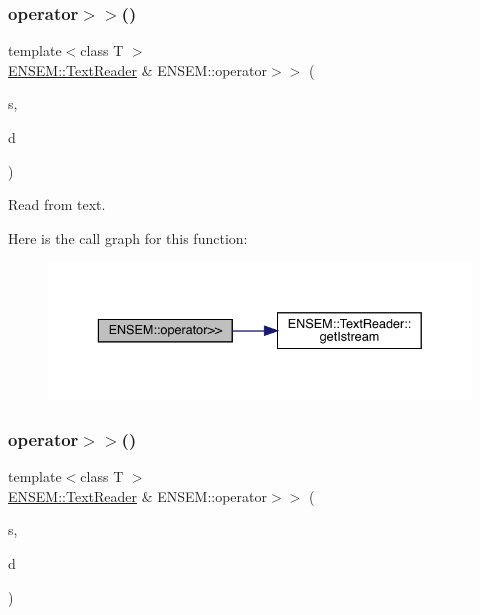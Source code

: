 \subsubsection{\texorpdfstring{operator$>$$>$()}{operator>>()}\hspace{0.1cm}{\footnotesize\ttfamily [4/7]}}
{\footnotesize\ttfamily template$<$class T $>$ \\
\mbox{\hyperlink{classENSEM_1_1TextReader}{E\+N\+S\+E\+M\+::\+Text\+Reader}} \& E\+N\+S\+E\+M\+::operator$>$$>$ (\begin{DoxyParamCaption}\item[{\mbox{\hyperlink{classENSEM_1_1TextReader}{E\+N\+S\+E\+M\+::\+Text\+Reader}} \&}]{s,  }\item[{\mbox{\hyperlink{classENSEM_1_1EScalar}{E\+Scalar}}$<$ \mbox{\hyperlink{classENSEM_1_1OTensor}{O\+Tensor}}$<$ T $>$ $>$ \&}]{d }\end{DoxyParamCaption})\hspace{0.3cm}{\ttfamily [inline]}}



Read from text. 

Here is the call graph for this function\+:\nopagebreak
\begin{figure}[H]
\begin{center}
\leavevmode
\includegraphics[width=336pt]{d2/d94/namespaceENSEM_a09c1f3286f4513b7ecefb96943278df6_cgraph}
\end{center}
\end{figure}
\mbox{\label{namespaceENSEM_a5d4f982512e5f2e704e9f359ce2bf383}} 
\subsubsection{\texorpdfstring{operator$>$$>$()}{operator>>()}\hspace{0.1cm}{\footnotesize\ttfamily [5/7]}}
{\footnotesize\ttfamily template$<$class T $>$ \\
\mbox{\hyperlink{classENSEM_1_1TextReader}{E\+N\+S\+E\+M\+::\+Text\+Reader}} \& E\+N\+S\+E\+M\+::operator$>$$>$ (\begin{DoxyParamCaption}\item[{\mbox{\hyperlink{classENSEM_1_1TextReader}{E\+N\+S\+E\+M\+::\+Text\+Reader}} \&}]{s,  }\item[{\mbox{\hyperlink{classENSEM_1_1Ensem}{Ensem}}$<$ \mbox{\hyperlink{classENSEM_1_1OScalar}{O\+Scalar}}$<$ T $>$ $>$ \&}]{d }\end{DoxyParamCaption})\hspace{0.3cm}{\ttfamily [inline]}}




